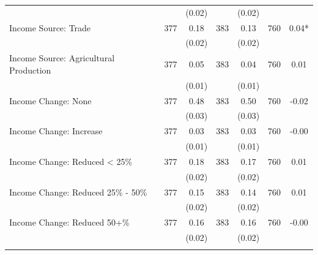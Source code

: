 \begin{tabular}{@{\extracolsep{5pt}}lcccccc}
 &   & (0.02)  &   & (0.02)  &   &  \\ [1ex]
Income Source: Trade   & 377    & 0.18    & 383    & 0.13    & 760    & 0.04*   \\
 &   & (0.02)  &   & (0.02)  &   &  \\ [1ex]
Income Source: Agricultural Production   & 377    & 0.05    & 383    & 0.04    & 760    & 0.01   \\
 &   & (0.01)  &   & (0.01)  &   &  \\ [1ex]
Income Change: None   & 377    & 0.48    & 383    & 0.50    & 760    & -0.02   \\
 &   & (0.03)  &   & (0.03)  &   &  \\ [1ex]
Income Change: Increase   & 377    & 0.03    & 383    & 0.03    & 760    & -0.00   \\
 &   & (0.01)  &   & (0.01)  &   &  \\ [1ex]
Income Change: Reduced < 25\%   & 377    & 0.18    & 383    & 0.17    & 760    & 0.01   \\
 &   & (0.02)  &   & (0.02)  &   &  \\ [1ex]
Income Change: Reduced 25\% - 50\%   & 377    & 0.15    & 383    & 0.14    & 760    & 0.01   \\
 &   & (0.02)  &   & (0.02)  &   &  \\ [1ex]
Income Change: Reduced 50+\%   & 377    & 0.16    & 383    & 0.16    & 760    & -0.00   \\
 &   & (0.02)  &   & (0.02)  &   &  \\ [1ex]
\hline \hline \\[-1.8ex]

\end{tabular}
